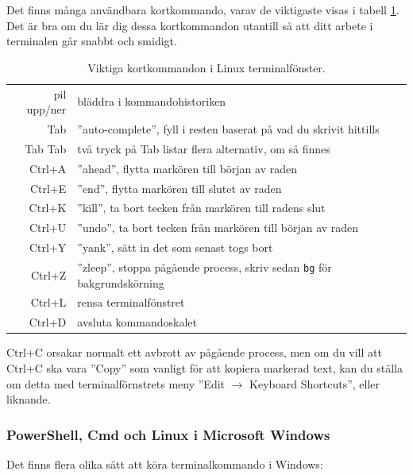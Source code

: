 Det finns många användbara kortkommando, varav de viktigaste visas i tabell \ref{fig:terminal:shortcuts}. Det är bra om du lär dig dessa kortkommandon utantill så att ditt arbete i terminalen går snabbt och smidigt.

\begin{table}[H]
\renewcommand{\arraystretch}{1.15}
\begin{tabular}{@{}r | l}
pil upp/ner & bläddra i kommandohistoriken \\
Tab & ''auto-complete'', fyll i resten baserat på vad du skrivit hittills \\
Tab Tab & två tryck på Tab listar flera alternativ, om så finnes \\
Ctrl+A & ''ahead'', flytta markören till början av raden \\
Ctrl+E & ''end'', flytta markören till slutet av raden \\
Ctrl+K & ''kill'', ta bort tecken från markören till radens slut\\
Ctrl+U & ''undo'', ta bort tecken från markören till början av raden \\
Ctrl+Y & ''yank'', sätt in det som senast togs bort\\
Ctrl+Z & ''zleep'', stoppa pågående process, skriv sedan \texttt{bg} för bakgrundskörning\\
Ctrl+L & rensa terminalfönstret\\
Ctrl+D & avsluta kommandoskalet \\
\end{tabular}
    \caption{Viktiga kortkommandon i Linux terminalfönster.}
    \label{fig:terminal:shortcuts}
\end{table}

\noindent Ctrl+C orsakar normalt ett avbrott av pågående process, men om du vill att Ctrl+C ska vara ''Copy'' som vanligt för att kopiera markerad text, kan du ställa om detta med terminalförnstrets  meny ''Edit $\rightarrow$ Keyboard Shortcuts'', eller liknande.




 
\subsubsection{PowerShell, Cmd och Linux i Microsoft Windows}
Det finns flera olika sätt att köra terminalkommando i Windows:

